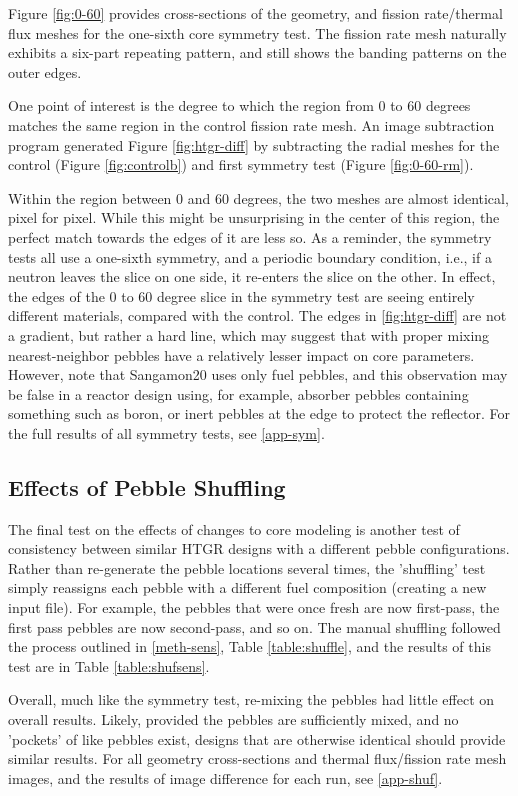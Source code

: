 

Figure \ref{fig:0-60} provides cross-sections of the geometry, and fission rate/thermal flux meshes for the one-sixth core symmetry test.  The fission rate mesh naturally exhibits a six-part repeating pattern, and still shows the banding patterns on the outer edges. 



One point of interest is the degree to which the region from 0 to 60 degrees matches the same region in the control fission rate mesh.  An image subtraction program generated Figure \ref{fig:htgr-diff} by subtracting the radial meshes for the control (Figure \ref{fig:controlb}) and first symmetry test (Figure \ref{fig:0-60-rm}).



Within the region between 0 and 60 degrees, the two meshes are almost identical, pixel for pixel.  While this might be unsurprising in the center of this region, the perfect match towards the edges of it are less so.  As a reminder, the symmetry tests all use a one-sixth symmetry, and a periodic boundary condition, i.e., if a neutron leaves the slice on one side, it re-enters the slice on the other.  In effect, the edges of the 0 to 60 degree slice in the symmetry test are seeing entirely different materials, compared with the control.  The edges in \ref{fig:htgr-diff} are not a gradient, but rather a hard line, which may suggest that with proper mixing nearest-neighbor pebbles have a relatively lesser impact on core parameters.  However, note that Sangamon20 uses only fuel pebbles, and this observation may be false in a reactor design using, for example, absorber pebbles containing something such as boron, or inert pebbles at the edge to protect the reflector.  For the full results of all symmetry tests, see \autoref{app-sym}.


\subsection{Effects of Pebble Shuffling}
\label{res-shuff}

The final test on the effects of changes to core modeling is another test of consistency between similar HTGR designs with a different pebble configurations.  Rather than re-generate the pebble locations several times, the 'shuffling' test simply reassigns each pebble with a different fuel composition (creating a new input file).  For example, the pebbles that were once fresh are now first-pass, the first pass pebbles are now second-pass, and so on.  The manual shuffling followed the process outlined in \autoref{meth-sens}, Table \ref{table:shuffle}, and the results of this test are in Table \ref{table:shufsens}.



Overall, much like the symmetry test, re-mixing the pebbles had little effect on overall results.  Likely, provided the pebbles are sufficiently mixed, and no 'pockets' of like pebbles exist, designs that are otherwise identical should provide similar results.  For all geometry cross-sections and thermal flux/fission rate mesh images, and the results of image difference for each run, see \autoref{app-shuf}.